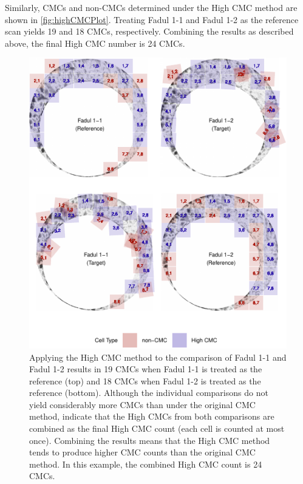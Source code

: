 Similarly, CMCs and non-CMCs determined under the High CMC method are
shown in \autoref{fig:highCMCPlot}. Treating Fadul 1-1 and Fadul 1-2 as
the reference scan yields 19 and 18 CMCs, respectively. Combining the
results as described above, the final High CMC number is 24 CMCs.

\begin{Schunk}
\begin{figure}[htbp]

{\centering \includegraphics[width=\textwidth]{figures/kmHighCMC}

}

\caption{\label{fig:highCMCPlot} Applying the High CMC method to the comparison of Fadul 1-1 and Fadul 1-2 results in 19 CMCs when Fadul 1-1 is treated as the reference (top) and 18 CMCs when Fadul 1-2 is treated as the reference (bottom). Although the individual comparisons do not yield considerably more CMCs than under the original CMC method, \citet{tong_improved_2015} indicate that the High CMCs from both comparisons are combined as the final High CMC count (each cell is counted at most once). Combining the results means that the High CMC method tends to produce higher CMC counts than the original CMC method. In this example, the combined High CMC count is 24 CMCs.}\label{fig:unnamed-chunk-17}
\end{figure}
\end{Schunk}


